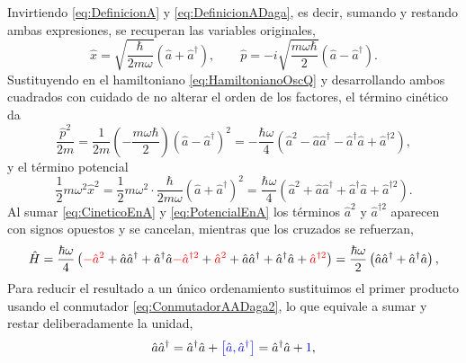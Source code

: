         Invirtiendo \eqref{eq:DefinicionA} y \eqref{eq:DefinicionADaga}, es decir, sumando y restando ambas expresiones, se recuperan las variables originales,
        \begin{equation}\label{eq:XPenA}
            \hat{x} = \sqrt{\frac{\hbar}{2m\omega}}\left(\hat{a}+\hat{a}^{\dagger}\right),
            \qquad
            \hat{p} = -i\sqrt{\frac{m\omega\hbar}{2}}\left(\hat{a}-\hat{a}^{\dagger}\right).
        \end{equation}
        Sustituyendo en el hamiltoniano \eqref{eq:HamiltonianoOscQ} y desarrollando ambos cuadrados con cuidado de no alterar el orden de los factores, el término cinético da
        \begin{equation}\label{eq:CineticoEnA}
            \frac{\hat{p}^{2}}{2m} = \frac{1}{2m}\left(-\frac{m\omega\hbar}{2}\right)\left(\hat{a}-\hat{a}^{\dagger}\right)^{2}
            = -\frac{\hbar\omega}{4}\left(\hat{a}^{2} - \hat{a}\hat{a}^{\dagger} - \hat{a}^{\dagger}\hat{a} + \hat{a}^{\dagger 2}\right),
        \end{equation}
        y el término potencial
        \begin{equation}\label{eq:PotencialEnA}
            \frac{1}{2}m\omega^{2}\hat{x}^{2} = \frac{1}{2}m\omega^{2}\cdot\frac{\hbar}{2m\omega}\left(\hat{a}+\hat{a}^{\dagger}\right)^{2}
            = \frac{\hbar\omega}{4}\left(\hat{a}^{2} + \hat{a}\hat{a}^{\dagger} + \hat{a}^{\dagger}\hat{a} + \hat{a}^{\dagger 2}\right).
        \end{equation}
        Al sumar \eqref{eq:CineticoEnA} y \eqref{eq:PotencialEnA} los términos $\hat{a}^{2}$ y $\hat{a}^{\dagger 2}$ aparecen con signos opuestos y se cancelan, mientras que los cruzados se refuerzan,
        \begin{equation}\label{eq:HamiltonianoSuma}
            \hat{H} = \frac{\hbar\omega}{4}\left(\textcolor{red}{-\hat{a}^{2}} + \hat{a}\hat{a}^{\dagger} + \hat{a}^{\dagger}\hat{a} \textcolor{red}{- \hat{a}^{\dagger 2}} + \textcolor{red}{\hat{a}^{2}} + \hat{a}\hat{a}^{\dagger} + \hat{a}^{\dagger}\hat{a} + \textcolor{red}{\hat{a}^{\dagger 2}}\right)
            = \frac{\hbar\omega}{2}\left(\hat{a}\hat{a}^{\dagger} + \hat{a}^{\dagger}\hat{a}\right),
        \end{equation}
        Para reducir el resultado a un único ordenamiento sustituimos el primer producto usando el conmutador \eqref{eq:ConmutadorAADaga2}, lo que equivale a sumar y restar deliberadamente la unidad,
        \begin{equation}\label{eq:ReordenamientoNormal}
            \hat{a}\hat{a}^{\dagger} = \hat{a}^{\dagger}\hat{a} + \textcolor{blue}{\left[\hat{a},\hat{a}^{\dagger}\right]} = \hat{a}^{\dagger}\hat{a} + \textcolor{blue}{1},
        \end{equation}
